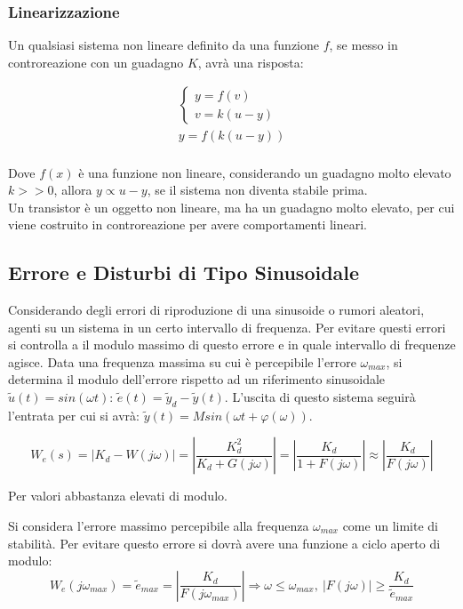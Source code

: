 \documentclass{article}
\numberwithin{equation}{subsection}
\begin{document}
\subsubsection{Linearizzazione}

Un qualsiasi sistema non lineare definito da una funzione $f$, se messo in controreazione con un guadagno $K$, avrà una risposta: 

\begin{gather}
    \begin{cases}
        y=f(v)\\
        v=k(u-y)
    \end{cases}\\
    y=f(k(u-y))\\
\end{gather}

Dove $f(x)$ è una funzione non lineare, considerando un guadagno molto elevato $k>>0$, allora $y\propto u-y$, se il sistema non diventa stabile prima. \\
Un transistor è un oggetto non lineare, ma ha un guadagno molto elevato, per cui viene costruito in controreazione per avere comportamenti lineari. 

\subsection{Errore e Disturbi di Tipo Sinusoidale}

Considerando degli errori di riproduzione di una sinusoide o rumori aleatori, agenti su un sistema in un certo intervallo di frequenza. Per evitare questi errori si controlla 
a il modulo massimo di questo errore e in quale intervallo di frequenze agisce. Data una frequenza massima su cui è percepibile l'errore $\omega_{max}$, si determina il modulo 
dell'errore rispetto ad un riferimento sinusoidale $\tilde{u}(t)=sin({\omega}t)$: $\tilde{e}(t)=\tilde{y}_d-\tilde{y}(t)$. L'uscita di questo sistema seguirà l'entrata 
per cui si avrà: $\tilde{y}(t)=Msin({\omega}t+{\varphi}({\omega}))$. 

\begin{equation}
    W_e(s)=|K_d-W(j\omega)|=\left|\displaystyle\frac{K_d^2}{K_d+G(j\omega)}\right|=\left|\frac{K_d}{1+F(j\omega)}\right|\approx\left|\frac{K_d}{F(j\omega)}\right|
\end{equation}

Per valori abbastanza elevati di modulo.


Si considera l'errore massimo percepibile alla frequenza $\omega_{max}$ come un limite di stabilità. Per evitare questo errore si dovrà avere una funzione a ciclo aperto di 
modulo:
\begin{equation}
    W_e(j\omega_{max})=\tilde{e}_{max}=\displaystyle\left|\frac{K_d}{F(j\omega_{max})}\right|\Rightarrow \omega\leq\omega_{max},\:|F(j\omega)|\geq\frac{K_d}{\tilde{e}_{max}}
\end{equation} 
\end{document}
